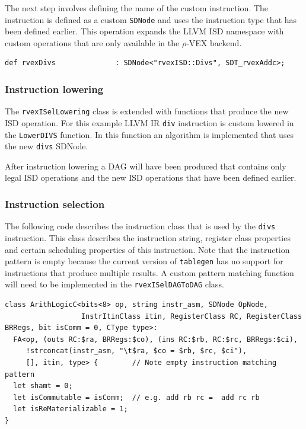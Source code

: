 The next step involves defining the name of the custom instruction. The instruction is defined as a custom \texttt{SDNode} and uses the instruction type that has been defined earlier. This operation expands the LLVM ISD namespace with custom operations that are only available in the $\rho$-VEX backend.

\begin{lstlisting}[language=tblgen]
def rvexDivs              : SDNode<"rvexISD::Divs", SDT_rvexAddc>;
\end{lstlisting}

\subsubsection{Instruction lowering}
The \texttt{rvexISelLowering} class is extended with functions that produce the new ISD operation. For this example LLVM IR \texttt{div} instruction is custom lowered in the \texttt{LowerDIVS} function. In this function an algorithm is implemented that uses the new \texttt{divs} SDNode.

After instruction lowering a DAG will have been produced that contains only legal ISD operations and the new ISD operations that have been defined earlier.

\subsubsection{Instruction selection}
The following code describes the instruction class that is used by the \texttt{divs} instruction. This class describes the instruction string, register class properties and certain scheduling properties of this instruction. Note that the instruction pattern is empty because the current version of \texttt{tablegen} has no support for instructions that produce multiple results. A custom pattern matching function will need to be implemented in the \texttt{rvexISelDAGToDAG} class.

\begin{lstlisting}[language=tblgen]
class ArithLogicC<bits<8> op, string instr_asm, SDNode OpNode,
                  InstrItinClass itin, RegisterClass RC, RegisterClass BRRegs, bit isComm = 0, CType type>:
  FA<op, (outs RC:$ra, BRRegs:$co), (ins RC:$rb, RC:$rc, BRRegs:$ci),
     !strconcat(instr_asm, "\t$ra, $co = $rb, $rc, $ci"),
     [], itin, type> {        // Note empty instruction matching pattern
  let shamt = 0;
  let isCommutable = isComm;  // e.g. add rb rc =  add rc rb
  let isReMaterializable = 1;
}
\end{lstlisting}

